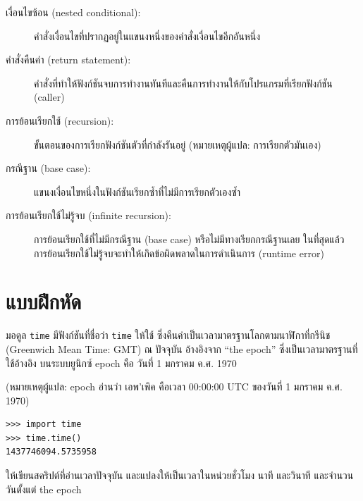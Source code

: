 \begin{description}
\item[เงื่อนไขซ้อน (nested conditional):]  คำสั่งเงื่อนไขที่ปรากฏอยู่ในแขนงหนึ่งของคำสั่งเงื่อนไขอีกอันหนึ่ง

\item[คำสั่งคืนค่า (return statement):] คำสั่งที่ทำให้ฟังก์ชันจบการทำงานทันทีและคืนการทำงานให้กับโปรแกรมที่เรียกฟังก์ชัน (caller)

\item[การย้อนเรียกใช้ (recursion):] ขั้นตอนของการเรียกฟังก์ชันตัวที่กำลังรันอยู่ (หมายเหตุผู้แปล: การเรียกตัวมันเอง) 

\item[กรณีฐาน (base case):]  แขนงเงื่อนไขหนึ่งในฟังก์ชันเรียกซ้ำที่ไม่มีการเรียกตัวเองซ้ำ

\item[การย้อนเรียกใช้ไม่รู้จบ (infinite recursion):]  การย้อนเรียกใช้ที่ไม่มีกรณีฐาน (base case) หรือไม่มีทางเรียกกรณีฐานเลย
ในที่สุดแล้ว การย้อนเรียกใช้ไม่รู้จบจะทำให้เกิดข้อผิดพลาดในการดำเนินการ (runtime error) 

\end{description}

\section{แบบฝึกหัด}

\begin{exercise}

มอดูล {\tt time}  มีฟังก์ชันที่ชื่อว่า {\tt time} ให้ใช้ ซึ่งคืนค่าเป็นเวลามาตรฐานโลกตามนาฬิกาที่กรีนิช 
(Greenwich Mean Time: GMT) ณ ปัจจุบัน อ้างอิงจาก ``the epoch'' ซึ่งเป็นเวลามาตรฐานที่ใช้อ้างอิง 
บนระบบยูนิกซ์  epoch คือ วันที่ 1 มกราคม ค.ศ. 1970

(หมายเหตุผู้แปล: epoch อ่านว่า เอพ'เพิค คือเวลา 00:00:00 UTC ของวันที่ 1 มกราคม ค.ศ. 1970)

\begin{verbatim}
>>> import time
>>> time.time()
1437746094.5735958
\end{verbatim}

ให้เขียนสคริปต์ที่อ่านเวลาปัจจุบัน และแปลงให้เป็นเวลาในหน่วยชั่วโมง นาที และวินาที และจำนวนวันตั้งแต่ the epoch

\end{exercise}


